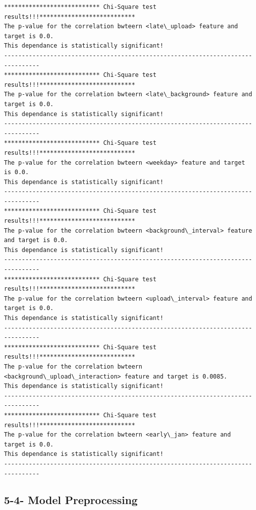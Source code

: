 \documentclass[11pt]{article}
\begin{document}
    \begin{Verbatim}[commandchars=\\\{\}]
*************************** Chi-Square test results!!!***************************
The p-value for the correlation bwteern <late\_upload> feature and target is 0.0.
This dependance is statistically significant!
--------------------------------------------------------------------------------
*************************** Chi-Square test results!!!***************************
The p-value for the correlation bwteern <late\_background> feature and target is 0.0.
This dependance is statistically significant!
--------------------------------------------------------------------------------
*************************** Chi-Square test results!!!***************************
The p-value for the correlation bwteern <weekday> feature and target is 0.0.
This dependance is statistically significant!
--------------------------------------------------------------------------------
*************************** Chi-Square test results!!!***************************
The p-value for the correlation bwteern <background\_interval> feature and target is 0.0.
This dependance is statistically significant!
--------------------------------------------------------------------------------
*************************** Chi-Square test results!!!***************************
The p-value for the correlation bwteern <upload\_interval> feature and target is 0.0.
This dependance is statistically significant!
--------------------------------------------------------------------------------
*************************** Chi-Square test results!!!***************************
The p-value for the correlation bwteern <background\_upload\_interaction> feature and target is 0.0085.
This dependance is statistically significant!
--------------------------------------------------------------------------------
*************************** Chi-Square test results!!!***************************
The p-value for the correlation bwteern <early\_jan> feature and target is 0.0.
This dependance is statistically significant!
--------------------------------------------------------------------------------

    \end{Verbatim}

    \subsection{5-4- Model Preprocessing}\label{model-preprocessing}
\end{document}

